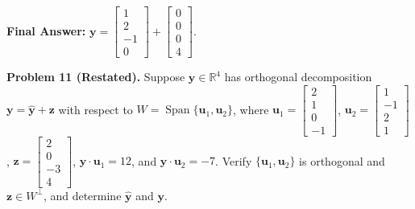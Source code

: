 \documentclass[11pt, letterpaper]{article}
\theoremstyle{definition}
\theoremstyle{remark}
\newcommand{\R}{\mathbb{R}}
\begin{document}
\textbf{Final Answer:} $\mathbf{y} = \begin{bmatrix} 1 \\ 2 \\ -1 \\ 0 \end{bmatrix} + \begin{bmatrix} 0 \\ 0 \\ 0 \\ 4 \end{bmatrix}$.

\medskip
\textbf{Problem 11 (Restated).} Suppose $\mathbf{y} \in \R^4$ has orthogonal decomposition $\mathbf{y} = \hat{\mathbf{y}} + \mathbf{z}$ with respect to $W = \operatorname{Span}\{\mathbf{u}_1, \mathbf{u}_2\}$, where $\mathbf{u}_1 = \begin{bmatrix} 2 \\ 1 \\ 0 \\ -1 \end{bmatrix}$, $\mathbf{u}_2 = \begin{bmatrix} 1 \\ -1 \\ 2 \\ 1 \end{bmatrix}$, $\mathbf{z} = \begin{bmatrix} 2 \\ 0 \\ -3 \\ 4 \end{bmatrix}$, $\mathbf{y} \cdot \mathbf{u}_1 = 12$, and $\mathbf{y} \cdot \mathbf{u}_2 = -7$. Verify $\{\mathbf{u}_1, \mathbf{u}_2\}$ is orthogonal and $\mathbf{z} \in W^\perp$, and determine $\hat{\mathbf{y}}$ and $\mathbf{y}$.
\end{document}
